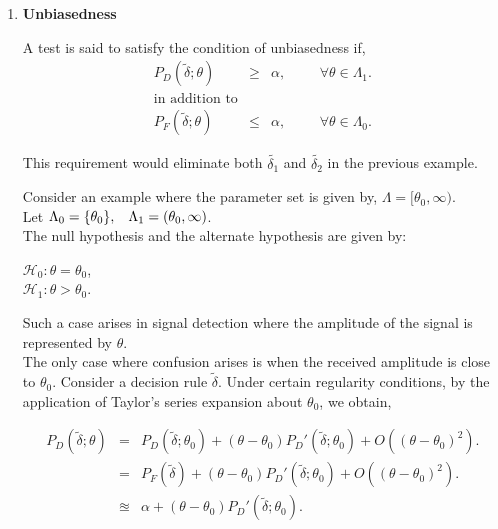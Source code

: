 \documentclass[a4paper,english,12pt]{article}
\begin{document}
\begin{enumerate}
\item \textbf{Unbiasedness}
\begin{defn}{A test is said to satisfy the condition of unbiasedness if,
\begin{eqnarray*} 
P_D(\widetilde{ \delta};\theta)&\geq&\alpha,  \hspace{1cm} \forall  \theta \in  \Lambda_1. \\
\text{in addition to}\\
P_F(\widetilde{\delta};\theta) &\leq& \alpha,  \hspace{1cm} \forall  \theta \in  \Lambda_0.
\end{eqnarray*}
}
\end{defn}	
This requirement would eliminate both $\tilde{\delta_1}$ and $\tilde{\delta_2}$ in the previous example.  

\begin{exmp} Consider an example where the parameter set is given by, $\Lambda = [\theta_0,\infty).$
\\Let $\Lambda_0 = \{\theta_0\}, \hspace{0.3cm} \Lambda_1 = (\theta_0, \infty)$.\\
The null hypothesis and the alternate hypothesis are given by:
\begin{center}
$\mathcal{H}_0 : \theta = \theta_0$, \\ $\mathcal{H}_1 : \theta > \theta_0.$
\end{center}
Such a case arises in signal detection where the amplitude of the signal is represented by $\theta$.\\
The only case where confusion arises is when the received amplitude is close to $\theta_0$. Consider a decision rule $\tilde{\delta}$. Under certain regularity conditions, by the application of Taylor's series expansion about $\theta_0$, we obtain,

\begin{eqnarray}
P_D(\widetilde{ \delta};\theta) &=& P_D(\widetilde{ \delta};\theta_0) + (\theta - \theta_0) P_{D}'(\widetilde{ \delta};\theta_0) + O((\theta - \theta_0)^2). \nonumber \\
&=&P_F(\widetilde{ \delta}) + (\theta - \theta_0) P_{D}'(\widetilde{ \delta};\theta_0) + O((\theta - \theta_0)^2). \nonumber \\
&\approxeq& \alpha + (\theta - \theta_0) P_{D}'(\widetilde{ \delta};\theta_0).
\end{eqnarray} 
\end{exmp}


\end{enumerate}
\end{document}

